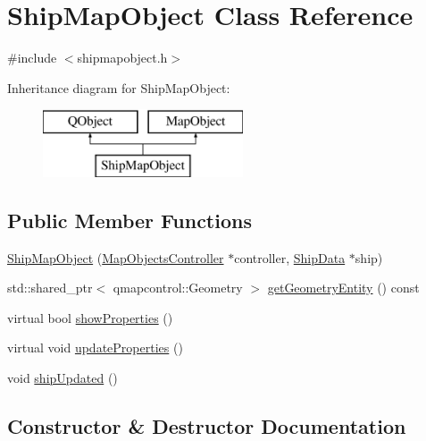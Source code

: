 \hypertarget{class_ship_map_object}{}\section{Ship\+Map\+Object Class Reference}
\label{class_ship_map_object}


{\ttfamily \#include $<$shipmapobject.\+h$>$}

Inheritance diagram for Ship\+Map\+Object\+:\begin{figure}[H]
\begin{center}
\leavevmode
\includegraphics[height=2.000000cm]{dd/da9/class_ship_map_object}
\end{center}
\end{figure}
\subsection*{Public Member Functions}
\begin{DoxyCompactItemize}
\item 
\mbox{\hyperlink{class_ship_map_object_a0a0a45f2754e86182638bb7e84495459}{Ship\+Map\+Object}} (\mbox{\hyperlink{class_map_objects_controller}{Map\+Objects\+Controller}} $\ast$controller, \mbox{\hyperlink{class_ship_data}{Ship\+Data}} $\ast$ship)
\item 
std\+::shared\+\_\+ptr$<$ qmapcontrol\+::\+Geometry $>$ \mbox{\hyperlink{class_ship_map_object_aaa5699009b3f1bc4d1c2a64ac3eb445c}{get\+Geometry\+Entity}} () const
\item 
virtual bool \mbox{\hyperlink{class_ship_map_object_a066dd918f052af419df95d101a36c0b8}{show\+Properties}} ()
\item 
virtual void \mbox{\hyperlink{class_ship_map_object_ad88a96fc3ad15c9ea919c2b6d3157fff}{update\+Properties}} ()
\item 
void \mbox{\hyperlink{class_ship_map_object_a33a93050d90d8580beacdeb7f5593a2e}{ship\+Updated}} ()
\end{DoxyCompactItemize}


\subsection{Constructor \& Destructor Documentation}
\mbox{\label{class_ship_map_object_a0a0a45f2754e86182638bb7e84495459}} 
